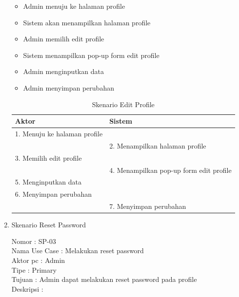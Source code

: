 \begin{enumerate}
\begin{itemize}
	\item Admin menuju ke halaman profile
	\item Sistem akan menampilkan halaman profile
	\item Admin memilih edit profile
	\item Sistem menampilkan pop-up form edit profile
	\item Admin menginputkan data
	\item Admin menyimpan perubahan

\end{itemize}

\begin{table}
	\caption{Skenario Edit Profile}
	\centering
	\begin{tabular}{ | l | l |}
		\hline 
		\textbf{Aktor} & \textbf{Sistem} \\
		\hline
		
		1.	Menuju ke halaman profile &  \\
		
		\hline
		
		&  2.	Menampilkan halaman profile \\
		
		\hline
		
		 3. Memilih edit profile & \\
		
		\hline
		
			& 4.	Menampilkan pop-up form edit profile \\
		
		\hline
		
		5.	Menginputkan data  & \\
		\hline
		
		6.	Menyimpan perubahan & \\
		\hline
		
		& 7.	Menyimpan perubahan \\
		\hline
		
	\end{tabular}
\end{table}

\item Skenario Reset Password

Nomor \kern 3.6pc : SP-03 \\
Nama Use Case : Melakukan reset password \\
Aktor  pc : Admin \\
Tipe \kern 4.6pc : Primary \\
Tujuan \kern 3.6pc : Admin dapat melakukan reset password pada profile \\
Deskripsi \kern 2.5pc : 


\end{enumerate}
